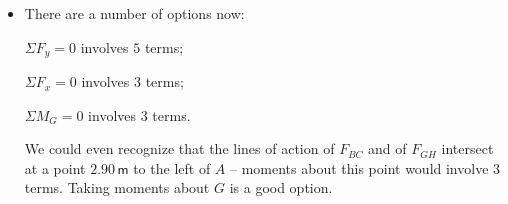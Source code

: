 \documentclass[8pt, xcolor={svgnames, x11names}]{beamer}
\begin{document}
\begin{frame}
{\begin{textblock*}{6cm}
      \begin{statsbox}[colback=LightCyan3!50, left=-2mm, right=2mm, height=3.625cm, top=1.5mm]{}
        \centering
        \begin{itemize}
          \resume
          \item<11-> There are a number of options now: \par $\Sigma F_y=0$ involves $5$ terms; \par $\Sigma F_x=0$ involves $3$ terms; \par $\Sigma M_G=0$ involves $3$ terms.\par We could even recognize that the lines of action of $F_{BC}$ and of $F_{GH}$ intersect at a point $2.90\,\textsf{m}$ to the left of $A$ -- moments about this point would involve $3$ terms. \parm
          Taking moments about $G$ is a good option.
        \end{itemize}        
      \end{statsbox}
    \end{textblock*}
  }


\end{frame}
\end{document}
